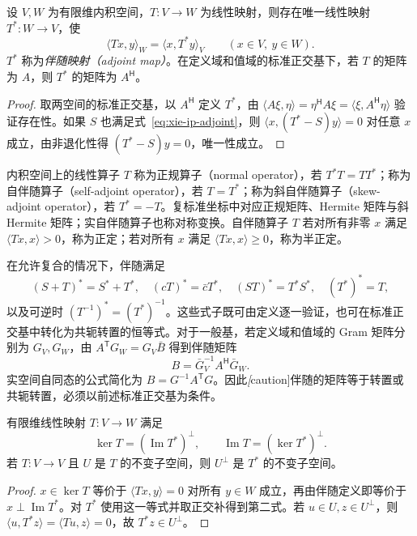 \begin{theorem}
设 $V,W$ 为有限维内积空间，$T:V\to W$ 为线性映射，则存在唯一线性映射 $T^*:W\to V$，使
\begin{equation}
\label{eq:xie-ip-adjoint}
\langle Tx,y\rangle_W=\langle x,T^*y\rangle_V
\qquad(x\in V,\ y\in W).
\end{equation}
$T^*$ 称为\emph{伴随映射（adjoint map）}。在定义域和值域的标准正交基下，若 $T$ 的矩阵为 $A$，则 $T^*$ 的矩阵为 $A^{\mathsf H}$。
\end{theorem}
\begin{proof}
取两空间的标准正交基，以 $A^{\mathsf H}$ 定义 $T^*$，由 $\langle A\xi,\eta\rangle=\eta^{\mathsf H}A\xi=\langle\xi,A^{\mathsf H}\eta\rangle$ 验证存在性。如果 $S$ 也满足式~\eqref{eq:xie-ip-adjoint}，则 $\langle x,(T^*-S)y\rangle=0$ 对任意 $x$ 成立，由非退化性得 $(T^*-S)y=0$，唯一性成立。
\end{proof}

\begin{definition}
内积空间上的线性算子 $T$ 称为正规算子（normal operator），若 $T^*T=TT^*$；称为自伴随算子（self-adjoint operator），若 $T=T^*$；称为斜自伴随算子（skew-adjoint operator），若 $T^*=-T$。复标准坐标中对应正规矩阵、Hermite 矩阵与斜 Hermite 矩阵；实自伴随算子也称对称变换。自伴随算子 $T$ 若对所有非零 $x$ 满足 $\langle Tx,x\rangle>0$，称为正定；若对所有 $x$ 满足 $\langle Tx,x\rangle\geq0$，称为半正定。
\end{definition}

在允许复合的情况下，伴随满足
\[
(S+T)^*=S^*+T^*,\quad(cT)^*=\bar cT^*,\quad
(ST)^*=T^*S^*,\quad(T^*)^*=T,
\]
以及可逆时 $(T^{-1})^*=(T^*)^{-1}$。这些式子既可由定义逐一验证，也可在标准正交基中转化为共轭转置的恒等式。对于一般基，若定义域和值域的 Gram 矩阵分别为 $G_V,G_W$，由 $A^{\mathsf T}G_W=G_V\bar B$ 得到伴随矩阵
\[
B=\bar G_V^{-1}A^{\mathsf H}\bar G_W.
\]
实空间自同态的公式简化为 $B=G^{-1}A^{\mathsf T}G$。因此\emph[caution]{伴随的矩阵等于转置或共轭转置，必须以前述标准正交基为条件}。

\begin{proposition}
\label{prop:xie-ip-adjoint-kernel}
有限维线性映射 $T:V\to W$ 满足
\[
\ker T=(\operatorname{Im}T^*)^\perp,\qquad
\operatorname{Im}T=(\ker T^*)^\perp.
\]
若 $T:V\to V$ 且 $U$ 是 $T$ 的不变子空间，则 $U^\perp$ 是 $T^*$ 的不变子空间。
\end{proposition}
\begin{proof}
$x\in\ker T$ 等价于 $\langle Tx,y\rangle=0$ 对所有 $y\in W$ 成立，再由伴随定义即等价于 $x\perp\operatorname{Im}T^*$。对 $T^*$ 使用这一等式并取正交补得到第二式。若 $u\in U,z\in U^\perp$，则 $\langle u,T^*z\rangle=\langle Tu,z\rangle=0$，故 $T^*z\in U^\perp$。
\end{proof}

